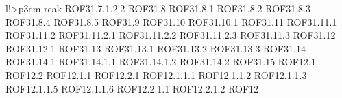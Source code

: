 \begin{tabella}{l!{\VRule}>{\centering\arraybackslash}p{3cm}}
reak ROF31.7.1.2.2 \linebreak ROF31.8 \linebreak ROF31.8.1 \linebreak ROF31.8.2 \linebreak ROF31.8.3 \linebreak ROF31.8.4 \linebreak ROF31.8.5 \linebreak ROF31.9 \linebreak ROF31.10 \linebreak ROF31.10.1 \linebreak ROF31.11 \linebreak ROF31.11.1 \linebreak ROF31.11.2 \linebreak ROF31.11.2.1 \linebreak ROF31.11.2.2 \linebreak ROF31.11.2.3 \linebreak ROF31.11.3 \linebreak ROF31.12 \linebreak ROF31.12.1 \linebreak ROF31.13 \linebreak ROF31.13.1 \linebreak ROF31.13.2 \linebreak ROF31.13.3 \linebreak ROF31.14 \linebreak ROF31.14.1 \linebreak ROF31.14.1.1 \linebreak ROF31.14.1.2 \linebreak ROF31.14.2 \linebreak ROF31.15 \linebreak ROF12.1 \linebreak ROF12.2 \linebreak ROF12.1.1 \linebreak ROF12.2.1 \linebreak ROF12.1.1.1 \linebreak ROF12.1.1.2 \linebreak ROF12.1.1.3 \linebreak ROF12.1.1.5 \linebreak ROF12.1.1.6 \linebreak ROF12.2.1.1 \linebreak ROF12.2.1.2 \linebreak ROF12 \\

\end{tabella}
